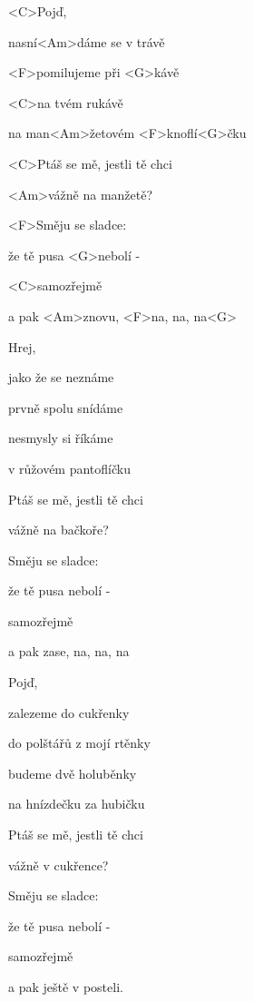 

\zs
<C>Pojď,

nasní<Am>dáme se v trávě

<F>pomilujeme  při <G>kávě

<C>na tvém rukávě

na man<Am>žetovém <F>knoflí<G>čku
\ks

\zr
<C>Ptáš se mě, jestli tě chci

<Am>vážně  na manžetě?

<F>Směju se sladce: 

že tě pusa <G>nebolí -

<C>samozřejmě

a pak <Am>znovu, <F>na, na, na<G>
\kr

\zs
Hrej,

jako že se neznáme

prvně spolu snídáme

nesmysly si říkáme

v růžovém pantoflíčku
\ks

\zr
Ptáš se mě, jestli tě chci

vážně na bačkoře?

Směju se sladce:

že tě pusa nebolí -

samozřejmě

a pak zase, na, na, na
\kr

\zs
Pojď,

zalezeme do cukřenky

do polštářů z mojí rtěnky

budeme dvě holuběnky

na hnízdečku za hubičku
\ks

\zr
Ptáš se mě, jestli tě chci

vážně  v cukřence?

Směju se sladce: 

že tě pusa nebolí -

samozřejmě

a pak ještě v posteli.
\kr

\kp
